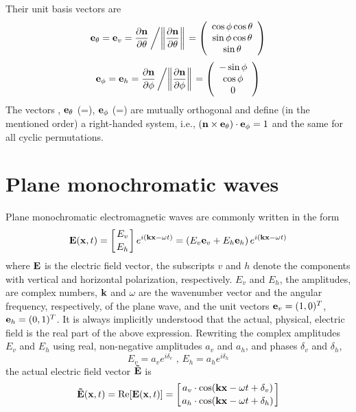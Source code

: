 %
Their unit basis vectors are
\begin{equation}
  \label{eq:polarization:etheta}
   \VctStl{e}_\theta = \eVrt =
    \PrtDrv{\VctStl{n}}{\theta} \left/ 
     \left\| \PrtDrv{\VctStl{n}}{\theta}\right\| \right.  
    =
    \ColVct{\cos\phi \cos\theta}%
           {\sin\phi \cos\theta}%
           { \sin\theta}
\end{equation}
%
\begin{equation}
  \label{eq:polarization:ephi}
   \VctStl{e}_\phi = \eHor = 
    \PrtDrv{\VctStl{n}}{\phi} \left/ 
          \left\|\PrtDrv{\VctStl{n}}{\phi}\right\| \right.  
    =
    \ColVct{-\sin\phi}%
           {\cos\phi}%
           { 0}
\end{equation}
The vectors , $\mathbf{e}_\theta$ (=\eVrt),
$\mathbf{e}_\phi$ (=\eHor) are
mutually orthogonal and define (in the mentioned order) a right-handed
system, i.e., 
$\left(\mathbf{n}\times \mathbf{e}_\theta\right) \cdot
\mathbf{e}_\phi = 1$ and the same for all cyclic permutations.


\section{Plane monochromatic waves}
\label{sec:polarization:monochrom}

Plane monochromatic electromagnetic waves are commonly written in the form
\begin{equation} 
  \label{eq:polarization:e_field}
  \mathbf{E}(\mathbf{x},t) 
   = \left[E_v \atop E_h\right] e^{i(\mathbf{k}\mathbf{x} - \omega t)}
   = \left(E_v \mathbf{e}_v +  E_h \mathbf{e}_h \right) 
      e^{i(\mathbf{k}\mathbf{x} - \omega t)}
\end{equation}
where $\mathbf{E}$ is the electric field vector, the subscripts $v$
and $h$ denote the components with vertical and horizontal
polarization, respectively. $E_v$ and $E_h$, the amplitudes, are
complex numbers, $\mathbf{k}$ and $\omega$ are the wavenumber vector
and the angular frequency, respectively, of the plane wave, and the
unit vectors $\mathbf{e}_v = (1,0)^T$, $\mathbf{e}_h = (0,1)^T$.  It is always
implicitly understood that the actual, physical, electric field is the
real part of the above expression. Rewriting the complex amplitudes
$E_v$ and $E_h$ using real, non-negative amplitudes $a_v$ and $a_h$, and
phases $\delta_v$ and $\delta_h$,
\begin{equation}
  \label{eq:polarization:compl_ampl}
  E_v=a_v e^{i\delta_v}\mbox{ , }
  E_h=a_h e^{i\delta_h}
\end{equation}
the actual electric field vector $\mathbf{\tilde{E}}$ is
\begin{equation}
  \label{eq:polarization:actual_efield}
  \mathbf{\tilde{E}}(\mathbf{x},t) = \mathrm{Re}[\mathbf{E}(\mathbf{x},t)] 
    = \left[a_v\cdot \cos(\mathbf{k}\mathbf{x} - \omega t + \delta_v) 
                       \atop 
            a_h\cdot \cos(\mathbf{k}\mathbf{x} - \omega t + \delta_h) 
       \right] 
\end{equation}

